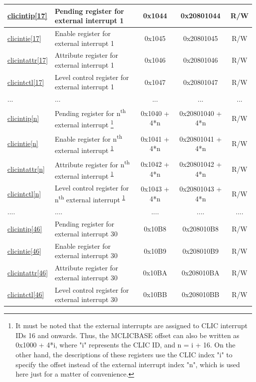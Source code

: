 \begin{longtable}{ | p{1.8cm} | p{7.5cm} | c | c | c | }
\hyperref[regdesc:MCLICINTIP_REG_i]{clicintip[17]} & Pending register for external interrupt 1 & 0x1044 & 0x20801044 & R/W \\\hline
\hyperref[regdesc:MCLICINTIE_REG_i]{clicintie[17]} & Enable register for external interrupt 1 & 0x1045 & 0x20801045 & R/W \\\hline
\hyperref[regdesc:MCLICINTATTR_REG_i]{clicintattr[17]} & Attribute register for external interrupt 1 & 0x1046 & 0x20801046 & R/W \\\hline
\hyperref[regdesc:MCLICINTCTL_REG_i]{clicintctl[17]} & Level control register for  external interrupt 1 & 0x1047 & 0x20801047 & R/W \\\hline

... & ... & ... & ... & ... \\\hline

\hyperref[regdesc:MCLICINTIP_REG_i]{clicintip[n]} & Pending register for n\textsuperscript{th} external interrupt \footnote{\label{note_mclic_index}It must be noted that the external interrupts are assigned to CLIC interrupt IDs 16 and onwards. Thus, the MCLICBASE offset can also be written as 0x1000 + 4*i, where "i" represents the CLIC ID, and n = i + 16. On the other hand, the descriptions of these registers use the CLIC index "i" to specify the offset instead of the external interrupt index "n", which is used here just for a matter of convenience.} & 0x1040 + 4*n & 0x20801040 + 4*n & R/W \\\hline
\hyperref[regdesc:MCLICINTIE_REG_i]{clicintie[n]} & Enable register for n\textsuperscript{th} external interrupt \textsuperscript{\ref{note_mclic_index}} & 0x1041 + 4*n & 0x20801041 + 4*n & R/W \\\hline
\hyperref[regdesc:MCLICINTATTR_REG_i]{clicintattr[n]} & Attribute register for n\textsuperscript{th} external interrupt \textsuperscript{\ref{note_mclic_index}} & 0x1042 + 4*n & 0x20801042 + 4*n & R/W \\\hline
\hyperref[regdesc:MCLICINTCTL_REG_i]{clicintctl[n]} & Level control register for n\textsuperscript{th} external interrupt \textsuperscript{\ref{note_mclic_index}} & 0x1043 + 4*n & 0x20801043 + 4*n & R/W \\\hline

.... & .... & .... & .... & .... \\\hline

\hyperref[regdesc:MCLICINTIP_REG_i]{clicintip[46]} & Pending register for external interrupt 30 & 0x10B8 & 0x208010B8 & R/W \\\hline
\hyperref[regdesc:MCLICINTIE_REG_i]{clicintie[46]} & Enable register for external interrupt 30 & 0x10B9 & 0x208010B9 & R/W \\\hline
\hyperref[regdesc:MCLICINTATTR_REG_i]{clicintattr[46]} & Attribute register for external interrupt 30 & 0x10BA & 0x208010BA & R/W \\\hline
\hyperref[regdesc:MCLICINTCTL_REG_i]{clicintctl[46]} & Level control register for  external interrupt 30 & 0x10BB & 0x208010BB & R/W \\\hline


\end{longtable}
